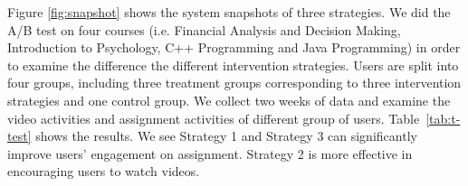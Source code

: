  	 	 	 Figure \ref{fig:snapshot} shows the system snapshots of three strategies. 
 	 	 	 We did the A/B test on four courses (i.e. Financial Analysis and Decision Making, Introduction to Psychology, C++ Programming and Java Programming) in order to examine the difference %
 	 	 	 the different intervention strategies. Users %
 	 	 	 are split into four groups, including three treatment groups corresponding to three intervention strategies and one control group. We collect two weeks of data and examine the video activities and assignment activities of different group of users. Table~\ref{tab:t-test} shows the results. 
 	 	 	 We see Strategy 1 and Strategy 3 can significantly improve users' engagement on assignment. Strategy 2 is more effective in encouraging users to watch videos.

		